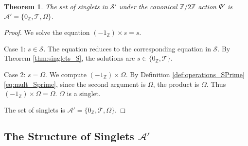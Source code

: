 \documentclass[11pt, a4paper]{article}
\theoremstyle{plain}
\newtheorem{theorem}{Theorem}[section]
\theoremstyle{definition}
\numberwithin{equation}{section}
\newcommand{\Z}{\mathbb{Z}}
\newcommand{\Tobj}{\mathcal{T}} %
\newcommand{\OmegaObj}{\Omega} %
\newcommand{\SemiringS}{\mathcal{S}}
\newcommand{\SemiringSPrime}{\mathcal{S}'}
\newcommand{\Ztwo}{\mathbb{Z}/2\mathbb{Z}}
\newcommand{\SetAPrime}{\mathcal{A}'}
\begin{document}
\begin{theorem}\label{thm:singlets_SPrime}
The set of singlets in $\SemiringSPrime$ under the canonical $\Ztwo$ action $\Psi'$ is $\SetAPrime = \{0_{\Z}, \Tobj, \OmegaObj\}$.
\end{theorem}
\begin{proof}
We solve the equation $(-1_{\Z})\times s = s$.

Case 1: $s \in \SemiringS$. The equation reduces to the corresponding equation in $\SemiringS$. By Theorem \ref{thm:singlets_S}, the solutions are $s \in \{0_{\Z}, \Tobj\}$.

Case 2: $s=\OmegaObj$. We compute $(-1_{\Z})\times\OmegaObj$. By Definition \ref{def:operations_SPrime} \eqref{eq:mult_Sprime}, since the second argument is $\OmegaObj$, the product is $\OmegaObj$.
Thus $(-1_{\Z})\times\OmegaObj = \OmegaObj$. $\OmegaObj$ is a singlet.

The set of singlets is $\SetAPrime = \{0_{\Z}, \Tobj, \OmegaObj\}$.
\end{proof}

\subsection{The Structure of Singlets $\SetAPrime$}
\end{document}
